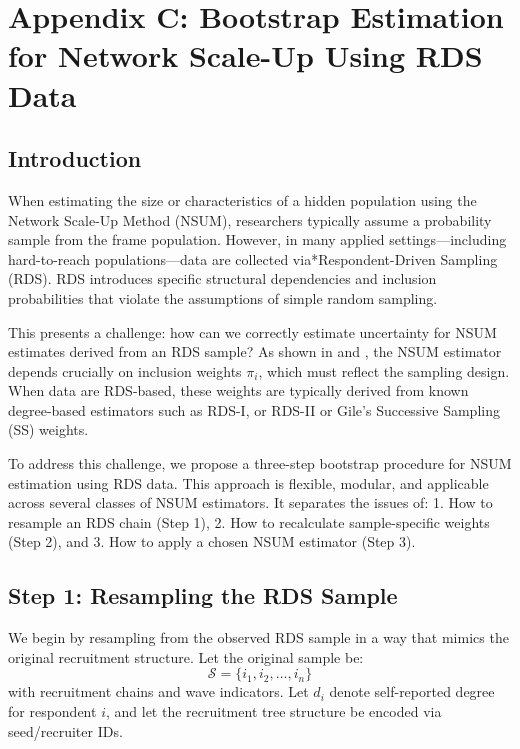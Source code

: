 \documentclass[
  12pt,
  letterpaper,
  DIV=11,
  numbers=noendperiod]{scrartcl}
\theoremstyle{plain}
\theoremstyle{definition}
\begin{document}
\section{Appendix C: Bootstrap Estimation for Network Scale-Up Using RDS
Data}\label{sec:3step}

\subsection{Introduction}\label{introduction}

When estimating the size or characteristics of a hidden population using
the Network Scale-Up Method (NSUM), researchers typically assume a
probability sample from the frame population. However, in many applied
settings---including hard-to-reach populations---data are collected
via*Respondent-Driven Sampling (RDS). RDS introduces specific structural
dependencies and inclusion probabilities that violate the assumptions of
simple random sampling.

This presents a challenge: how can we correctly estimate uncertainty for
NSUM estimates derived from an RDS sample? As shown in
\textcite{feeh16-generalizing} and \textcite{salg06-variance}, the NSUM
estimator depends crucially on inclusion weights \(\pi_i\), which must
reflect the sampling design. When data are RDS-based, these weights are
typically derived from known degree-based estimators such as RDS-I, or
RDS-II or Gile's Successive Sampling (SS) weights.

To address this challenge, we propose a three-step bootstrap procedure
for NSUM estimation using RDS data. This approach is flexible, modular,
and applicable across several classes of NSUM estimators. It separates
the issues of: 1. How to resample an RDS chain (Step 1), 2. How to
recalculate sample-specific weights (Step 2), and 3. How to apply a
chosen NSUM estimator (Step 3).

\subsection{Step 1: Resampling the RDS
Sample}\label{step-1-resampling-the-rds-sample}

We begin by resampling from the observed RDS sample in a way that mimics
the original recruitment structure. Let the original sample be: \[
\mathcal{S} = \{i_1, i_2, \dots, i_n\}
\] with recruitment chains and wave indicators. Let \(d_i\) denote
self-reported degree for respondent \(i\), and let the recruitment tree
structure be encoded via seed/recruiter IDs.
\end{document}
